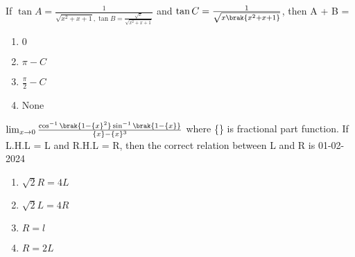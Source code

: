 \item If $\tan A = \frac{1}{\sqrt{x^2 + x + 1}, \tan B = \frac{\sqrt{x}}{\sqrt{x^2 + x +1}} }$ and $\tan C = \frac{1}{\sqrt{x\brak{x^2 + x +1}}}$, then A + B =  \hfill {}

\begin{multicols}{4}
\begin{enumerate}
    \item $0$ 
    \item $\pi - C$ 
    \item $\frac{\pi}{2} - C$ 
    \item None 
\end{enumerate}
\end{multicols}


\item $\lim_{x \to 0} \frac{\cos^{-1}\brak{1 - \{x\}^2}\sin^{-1}\brak{1 - \{x\}}}{\{x\} - \{x\}^3}$ where \{\} is fractional part function. If L.H.L = L and R.H.L = R, then the correct relation between L and R is \hfill 01-02-2024

\begin{multicols}{4}
\begin{enumerate}
    \item $\sqrt{2}R = 4L$ 
    \item $\sqrt{2}L = 4R$ 
    \item $R = l$ 
    \item $R = 2L$ 
\end{enumerate}
\end{multicols}

%
